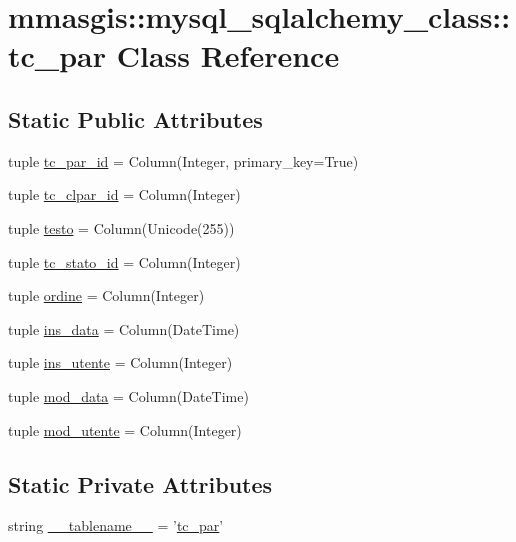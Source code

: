 \hypertarget{classmmasgis_1_1mysql__sqlalchemy__class_1_1tc__par}{
\section{mmasgis::mysql\_\-sqlalchemy\_\-class::tc\_\-par Class Reference}
\label{classmmasgis_1_1mysql__sqlalchemy__class_1_1tc__par}
}
\subsection*{Static Public Attributes}
\begin{DoxyCompactItemize}
\item 
tuple \hyperlink{classmmasgis_1_1mysql__sqlalchemy__class_1_1tc__par_ab5c1c6775174303e02a1ff67aabd426f}{tc\_\-par\_\-id} = Column(Integer, primary\_\-key=True)
\item 
tuple \hyperlink{classmmasgis_1_1mysql__sqlalchemy__class_1_1tc__par_a5aee42b66e7275adaa6cdf948977390c}{tc\_\-clpar\_\-id} = Column(Integer)
\item 
tuple \hyperlink{classmmasgis_1_1mysql__sqlalchemy__class_1_1tc__par_acf84628d798adba06d0a520f03f42f25}{testo} = Column(Unicode(255))
\item 
tuple \hyperlink{classmmasgis_1_1mysql__sqlalchemy__class_1_1tc__par_aae011588a95850fe4c53313ebf98c066}{tc\_\-stato\_\-id} = Column(Integer)
\item 
tuple \hyperlink{classmmasgis_1_1mysql__sqlalchemy__class_1_1tc__par_a512c07674ee91592baf169c5fabaf314}{ordine} = Column(Integer)
\item 
tuple \hyperlink{classmmasgis_1_1mysql__sqlalchemy__class_1_1tc__par_a3ea017d0dadfce48a3978f72e76af80e}{ins\_\-data} = Column(DateTime)
\item 
tuple \hyperlink{classmmasgis_1_1mysql__sqlalchemy__class_1_1tc__par_af374fac8a68cc4836c83134fb122dd6a}{ins\_\-utente} = Column(Integer)
\item 
tuple \hyperlink{classmmasgis_1_1mysql__sqlalchemy__class_1_1tc__par_a8e994c079cf7097acc8c6346de974c4e}{mod\_\-data} = Column(DateTime)
\item 
tuple \hyperlink{classmmasgis_1_1mysql__sqlalchemy__class_1_1tc__par_a78f9cd94837ce65f496c6942642cc0f6}{mod\_\-utente} = Column(Integer)
\end{DoxyCompactItemize}
\subsection*{Static Private Attributes}
\begin{DoxyCompactItemize}
\item 
string \hyperlink{classmmasgis_1_1mysql__sqlalchemy__class_1_1tc__par_a7cd4a074ce542c69aef90f28c46a299f}{\_\-\_\-tablename\_\-\_\-} = '\hyperlink{classmmasgis_1_1mysql__sqlalchemy__class_1_1tc__par}{tc\_\-par}'
\end{DoxyCompactItemize}


